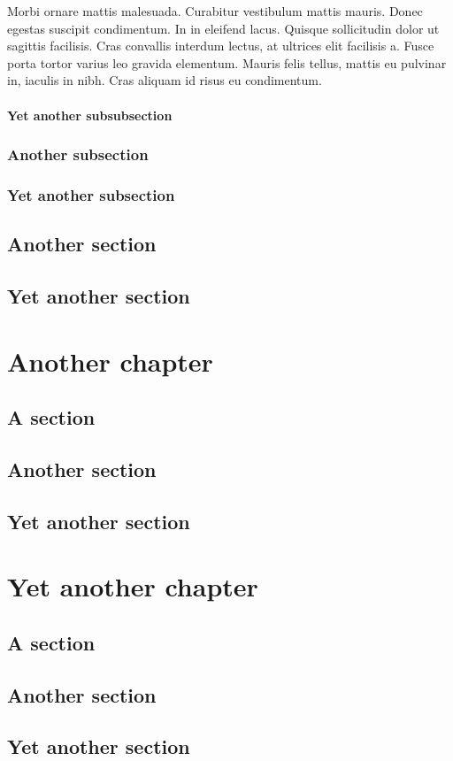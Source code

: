 \documentclass{abe}
\begin{document}
Morbi ornare mattis malesuada. Curabitur vestibulum mattis mauris. Donec egestas suscipit condimentum. In in eleifend lacus. Quisque sollicitudin dolor ut sagittis facilisis. Cras convallis interdum lectus, at ultrices elit facilisis a. Fusce porta tortor varius leo gravida elementum. Mauris felis tellus, mattis eu pulvinar in, iaculis in nibh. Cras aliquam id risus eu condimentum.

\subsubsection{Yet another subsubsection}
\subsection{Another subsection}
\subsection{Yet another subsection}
\section{Another section}
\section{Yet another section}

\chapter{Another chapter}
\section{A section}
\section{Another section}
\section{Yet another section}

\chapter{Yet another chapter}
\section{A section}
\section{Another section}
\section{Yet another section}

\backmatter%



 
\end{document}
